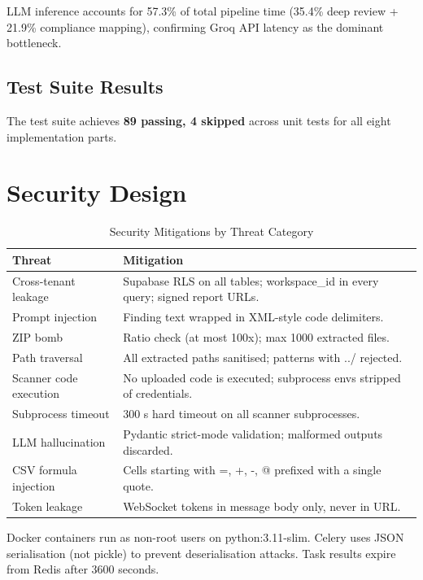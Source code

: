 \documentclass[conference]{IEEEtran}
\begin{document}
LLM inference accounts for 57.3\% of total pipeline time (35.4\% deep
review + 21.9\% compliance mapping), confirming Groq API latency as the
dominant bottleneck.

\subsection{Test Suite Results}
The test suite achieves \textbf{89 passing, 4 skipped} across unit tests
for all eight implementation parts.

\section{Security Design}
\label{sec:security}

\begin{table}[htbp]
\centering
\caption{Security Mitigations by Threat Category}
\label{tab:security}
\scriptsize
\begin{tabular}{@{}lp{4.8cm}@{}}
\toprule
\textbf{Threat} & \textbf{Mitigation} \\
\midrule
Cross-tenant leakage
  & Supabase RLS on all tables; workspace\_id in every query; signed report URLs. \\
Prompt injection
  & Finding text wrapped in XML-style code delimiters. \\
ZIP bomb
  & Ratio check (at most 100x); max 1000 extracted files. \\
Path traversal
  & All extracted paths sanitised; patterns with ../ rejected. \\
Scanner code execution
  & No uploaded code is executed; subprocess envs stripped of credentials. \\
Subprocess timeout
  & 300 s hard timeout on all scanner subprocesses. \\
LLM hallucination
  & Pydantic strict-mode validation; malformed outputs discarded. \\
CSV formula injection
  & Cells starting with =, +, -, @ prefixed with a single quote. \\
Token leakage
  & WebSocket tokens in message body only, never in URL. \\
\bottomrule
\end{tabular}
\end{table}

Docker containers run as non-root users on python:3.11-slim. Celery uses
JSON serialisation (not pickle) to prevent deserialisation attacks.
Task results expire from Redis after 3600 seconds.
\end{document}
